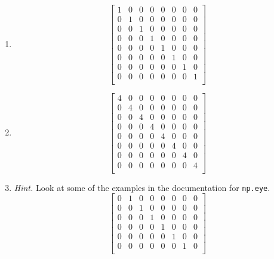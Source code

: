 \documentclass{article}
\theoremstyle{remark}
\begin{document}
\begin{enumerate}
\item
  \begin{displaymath}
    \begin{bmatrix}
      1 & 0 & 0 & 0 & 0 & 0 & 0 & 0 \\
      0 & 1 & 0 & 0 & 0 & 0 & 0 & 0 \\
      0 & 0 & 1 & 0 & 0 & 0 & 0 & 0 \\
      0 & 0 & 0 & 1 & 0 & 0 & 0 & 0 \\
      0 & 0 & 0 & 0 & 1 & 0 & 0 & 0 \\
      0 & 0 & 0 & 0 & 0 & 1 & 0 & 0 \\
      0 & 0 & 0 & 0 & 0 & 0 & 1 & 0 \\
      0 & 0 & 0 & 0 & 0 & 0 & 0 & 1 \\
    \end{bmatrix}
  \end{displaymath}
\item
  \begin{displaymath}
    \begin{bmatrix}
      4 & 0 & 0 & 0 & 0 & 0 & 0 & 0 \\
      0 & 4 & 0 & 0 & 0 & 0 & 0 & 0 \\
      0 & 0 & 4 & 0 & 0 & 0 & 0 & 0 \\
      0 & 0 & 0 & 4 & 0 & 0 & 0 & 0 \\
      0 & 0 & 0 & 0 & 4 & 0 & 0 & 0 \\
      0 & 0 & 0 & 0 & 0 & 4 & 0 & 0 \\
      0 & 0 & 0 & 0 & 0 & 0 & 4 & 0 \\
      0 & 0 & 0 & 0 & 0 & 0 & 0 & 4 \\
    \end{bmatrix}
  \end{displaymath}
\item
  \textit{Hint.} Look at some of the examples in the documentation for \texttt{np.eye}.
  \begin{displaymath}
    \begin{bmatrix}
      0 & 1 & 0 & 0 & 0 & 0 & 0 & 0 \\
      0 & 0 & 1 & 0 & 0 & 0 & 0 & 0 \\
      0 & 0 & 0 & 1 & 0 & 0 & 0 & 0 \\
      0 & 0 & 0 & 0 & 1 & 0 & 0 & 0 \\
      0 & 0 & 0 & 0 & 0 & 1 & 0 & 0 \\
      0 & 0 & 0 & 0 & 0 & 0 & 1 & 0 \\

\end{bmatrix}
\end{displaymath}
\end{enumerate}
\end{document}
